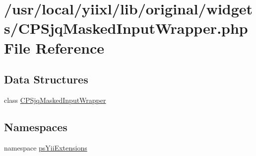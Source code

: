 \hypertarget{CPSjqMaskedInputWrapper_8php}{
\section{/usr/local/yiixl/lib/original/widgets/CPSjqMaskedInputWrapper.php File Reference}
\label{CPSjqMaskedInputWrapper_8php}
}
\subsection*{Data Structures}
\begin{DoxyCompactItemize}
\item 
class \hyperlink{classCPSjqMaskedInputWrapper}{CPSjqMaskedInputWrapper}
\end{DoxyCompactItemize}
\subsection*{Namespaces}
\begin{DoxyCompactItemize}
\item 
namespace \hyperlink{namespacepsYiiExtensions}{psYiiExtensions}
\end{DoxyCompactItemize}
